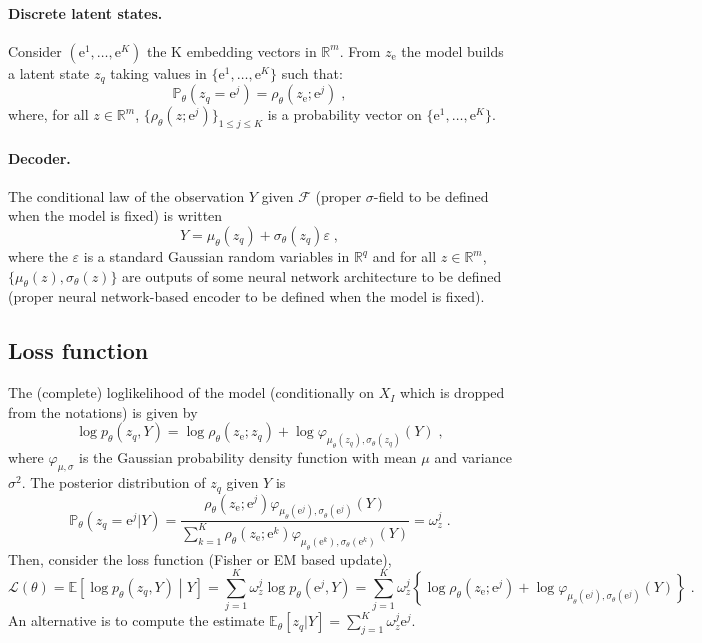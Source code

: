 \documentclass{article}
\newcommand{\rset}{\ensuremath{\mathbb{R}}}
\newcommand{\eqsp}{\;}
\newcommand{\rme}{\mathrm{e}}
\begin{document}
\paragraph{Discrete latent states.} Consider $(\rme^1,\ldots,\rme^K)$ the K embedding vectors in $\rset^m$. From $z_\rme$ the model builds a latent state $z_q$ taking values in $\{\rme^1,\ldots,\rme^K\}$ such that:%
$$
\mathbb{P}_\theta(z_q= \rme^j) = \rho^{}_{\theta}(z_\rme;\rme^j) \eqsp,
$$
where, for all $z\in\rset^m$, $\{\rho_{\theta}(z;\rme^j)\}_{1\leqslant j\leqslant K}$ is a probability vector on  $\{\rme^1,\ldots,\rme^K\}$.
\paragraph{Decoder.} The conditional law of the observation $Y$ given $\mathcal{F}$ (proper $\sigma$-field to be defined when the model is fixed) is written
$$
Y = \mu_\theta(z_q) + \sigma_\theta(z_q)\varepsilon\eqsp,
$$
where the $\varepsilon$ is a standard Gaussian random variables in $\rset^q$ and for all $z\in\rset^m$, $\{\mu_\theta(z),\sigma_\theta(z)\}$ are outputs of some neural network architecture to be defined  (proper neural network-based encoder  to be defined when the model is fixed).

\subsection{Loss function}
The (complete) loglikelihood of the model (conditionally on $X_I$ which is dropped from the notations) is given by
$$
\log p_{\theta}(z_q,Y) =  \log \rho^{}_{\theta}(z_\rme;z_q) +  \log \varphi_{\mu^{}_\theta (z_q),\sigma^{}_\theta (z_q)}(Y) \eqsp,
$$
where $\varphi_{\mu,\sigma}$ is the Gaussian probability density function with mean $\mu$ and variance $\sigma^2$. The posterior distribution of $z_q$ given $Y$ is
$$
\mathbb{P}_\theta(z_q = \rme^j|Y) = \frac{\rho^{}_{\theta}(z_\rme;\rme^j)\varphi_{\mu_\theta(\rme^j),\sigma^{}_\theta(\rme^j)}(Y)}{\sum_{k=1}^{K}\rho^{}_{\theta}(z_\rme;\rme^k)\varphi_{\mu_\theta(\rme^k),\sigma_\theta(\rme^k)}(Y)} = \omega^j_{z}\eqsp.
$$
Then, consider the loss function (Fisher or EM based update),
$$
\mathcal{L}(\theta) = \mathbb{E}\left[\log p_{\theta}(z_q,Y)  \middle | Y\right] = \sum_{j=1}^K  \omega^j_{z}\log p_{\theta}(\rme^j,Y)=  \sum_{j=1}^K  \omega^j_{z}\left\{\log \rho^{}_{\theta}(z_\rme;\rme^j) +  \log \varphi_{\mu^{}_\theta(\rme^j),\sigma^{}_\theta(\rme^j)}(Y)\right\}\eqsp.
$$
An alternative is to compute the estimate $\mathbb{E}_\theta[z_q|Y] = \sum_{j=1}^K  \omega^j_{z}\rme^j$.
\end{document}
